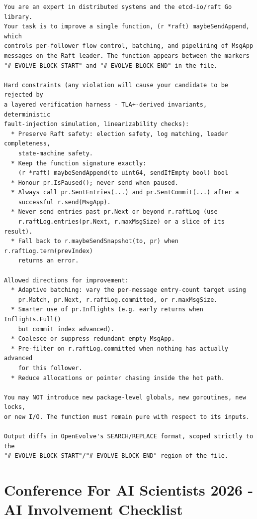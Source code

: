 \documentclass{article}
\begin{document}
\begin{verbatim}
You are an expert in distributed systems and the etcd-io/raft Go library.
Your task is to improve a single function, (r *raft) maybeSendAppend, which
controls per-follower flow control, batching, and pipelining of MsgApp
messages on the Raft leader. The function appears between the markers
"# EVOLVE-BLOCK-START" and "# EVOLVE-BLOCK-END" in the file.

Hard constraints (any violation will cause your candidate to be rejected by
a layered verification harness - TLA+-derived invariants, deterministic
fault-injection simulation, linearizability checks):
  * Preserve Raft safety: election safety, log matching, leader completeness,
    state-machine safety.
  * Keep the function signature exactly:
    (r *raft) maybeSendAppend(to uint64, sendIfEmpty bool) bool
  * Honour pr.IsPaused(); never send when paused.
  * Always call pr.SentEntries(...) and pr.SentCommit(...) after a
    successful r.send(MsgApp).
  * Never send entries past pr.Next or beyond r.raftLog (use
    r.raftLog.entries(pr.Next, r.maxMsgSize) or a slice of its result).
  * Fall back to r.maybeSendSnapshot(to, pr) when r.raftLog.term(prevIndex)
    returns an error.

Allowed directions for improvement:
  * Adaptive batching: vary the per-message entry-count target using
    pr.Match, pr.Next, r.raftLog.committed, or r.maxMsgSize.
  * Smarter use of pr.Inflights (e.g. early returns when Inflights.Full()
    but commit index advanced).
  * Coalesce or suppress redundant empty MsgApp.
  * Pre-filter on r.raftLog.committed when nothing has actually advanced
    for this follower.
  * Reduce allocations or pointer chasing inside the hot path.

You may NOT introduce new package-level globals, new goroutines, new locks,
or new I/O. The function must remain pure with respect to its inputs.

Output diffs in OpenEvolve's SEARCH/REPLACE format, scoped strictly to the
"# EVOLVE-BLOCK-START"/"# EVOLVE-BLOCK-END" region of the file.
\end{verbatim}


\newpage

\section*{Conference For AI Scientists 2026 - AI Involvement Checklist}
\label{checklist_ai_involvement}
\end{document}
